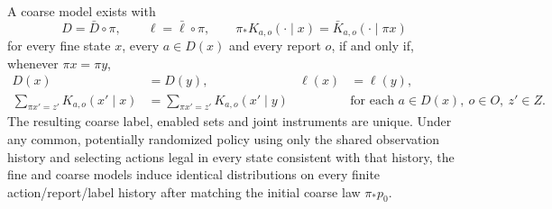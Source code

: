 \begin{theorem}\label{r:joint-quotient}
A coarse model exists with
\[
D=\bar D\circ\pi,\qquad \ell=\bar\ell\circ\pi,
\qquad \pi_*K_{a,o}(\cdot\mid x)=\bar K_{a,o}(\cdot\mid\pi x)
\]
for every fine state $x$, every $a\in D(x)$ and every report $o$, if and only if, whenever $\pi x=\pi y$,
\begin{align}
D(x)&=D(y), & \ell(x)&=\ell(y),\label{eq:fibre-legal}\\[-1mm]
\sum_{\pi x'=z'}K_{a,o}(x'\mid x)&=\sum_{\pi x'=z'}K_{a,o}(x'\mid y)
&&\text{for each }a\in D(x),\ o\in O,\ z'\in Z.\label{eq:fibre-joint}
\end{align}
The resulting coarse label, enabled sets and joint instruments are unique. Under any common, potentially randomized policy using only the shared observation history and selecting actions legal in every state consistent with that history, the fine and coarse models induce identical distributions on every finite action/report/label history after matching the initial coarse law $\pi_*p_0$.
\end{theorem}
